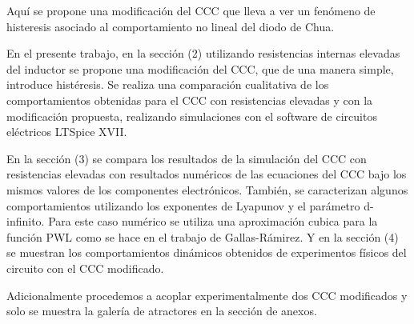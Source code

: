 \documentclass{rbf}
\begin{document}
Aquí se propone una modificación del CCC que lleva a ver un fenómeno de histeresis asociado al comportamiento no lineal del diodo de Chua.

En el presente trabajo, en la sección (2) utilizando resistencias internas elevadas del inductor se propone una modificación del CCC, que de una manera simple, introduce histéresis. Se realiza una comparación cualitativa de los comportamientos obtenidas para el CCC con resistencias elevadas y con la modificación propuesta, realizando simulaciones con el software de circuitos eléctricos LTSpice XVII.

En la sección (3) se compara los resultados de la simulación del CCC con resistencias elevadas con resultados numéricos de las ecuaciones del CCC bajo los mismos valores de los componentes electrónicos. 
También, se caracterizan algunos comportamientos utilizando los exponentes de Lyapunov y el parámetro d-infinito. Para este caso numérico se utiliza una aproximación cubica para la función PWL como se hace en el trabajo de Gallas-Rámirez. Y en la sección (4) se muestran los comportamientos dinámicos obtenidos de experimentos físicos del circuito con el CCC modificado. 

Adicionalmente procedemos a acoplar experimentalmente dos CCC modificados y solo se muestra la galería de atractores en la sección de anexos.
\end{document}

